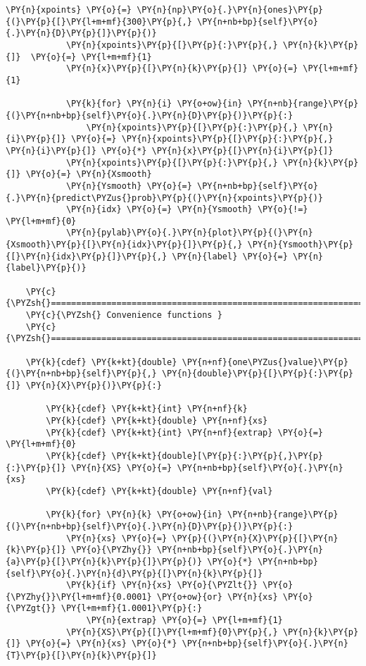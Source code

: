 \begin{Verbatim}[commandchars=\\\{\}]
            \PY{n}{xpoints} \PY{o}{=} \PY{n}{np}\PY{o}{.}\PY{n}{ones}\PY{p}{(}\PY{p}{[}\PY{l+m+mf}{300}\PY{p}{,} \PY{n+nb+bp}{self}\PY{o}{.}\PY{n}{D}\PY{p}{]}\PY{p}{)}
            \PY{n}{xpoints}\PY{p}{[}\PY{p}{:}\PY{p}{,} \PY{n}{k}\PY{p}{]}  \PY{o}{=} \PY{l+m+mf}{1}
            \PY{n}{x}\PY{p}{[}\PY{n}{k}\PY{p}{]} \PY{o}{=} \PY{l+m+mf}{1}

            \PY{k}{for} \PY{n}{i} \PY{o+ow}{in} \PY{n+nb}{range}\PY{p}{(}\PY{n+nb+bp}{self}\PY{o}{.}\PY{n}{D}\PY{p}{)}\PY{p}{:}
                \PY{n}{xpoints}\PY{p}{[}\PY{p}{:}\PY{p}{,} \PY{n}{i}\PY{p}{]} \PY{o}{=} \PY{n}{xpoints}\PY{p}{[}\PY{p}{:}\PY{p}{,} \PY{n}{i}\PY{p}{]} \PY{o}{*} \PY{n}{x}\PY{p}{[}\PY{n}{i}\PY{p}{]}
            \PY{n}{xpoints}\PY{p}{[}\PY{p}{:}\PY{p}{,} \PY{n}{k}\PY{p}{]} \PY{o}{=} \PY{n}{Xsmooth}
            \PY{n}{Ysmooth} \PY{o}{=} \PY{n+nb+bp}{self}\PY{o}{.}\PY{n}{predict\PYZus{}prob}\PY{p}{(}\PY{n}{xpoints}\PY{p}{)}
            \PY{n}{idx} \PY{o}{=} \PY{n}{Ysmooth} \PY{o}{!=} \PY{l+m+mf}{0}
            \PY{n}{pylab}\PY{o}{.}\PY{n}{plot}\PY{p}{(}\PY{n}{Xsmooth}\PY{p}{[}\PY{n}{idx}\PY{p}{]}\PY{p}{,} \PY{n}{Ysmooth}\PY{p}{[}\PY{n}{idx}\PY{p}{]}\PY{p}{,} \PY{n}{label} \PY{o}{=} \PY{n}{label}\PY{p}{)}
    
    \PY{c}{\PYZsh{}==========================================================================}
    \PY{c}{\PYZsh{} Convenience functions }
    \PY{c}{\PYZsh{}===========================================================================}

    \PY{k}{cdef} \PY{k+kt}{double} \PY{n+nf}{one\PYZus{}value}\PY{p}{(}\PY{n+nb+bp}{self}\PY{p}{,} \PY{n}{double}\PY{p}{[}\PY{p}{:}\PY{p}{]} \PY{n}{X}\PY{p}{)}\PY{p}{:}
        
        \PY{k}{cdef} \PY{k+kt}{int} \PY{n+nf}{k}
        \PY{k}{cdef} \PY{k+kt}{double} \PY{n+nf}{xs}
        \PY{k}{cdef} \PY{k+kt}{int} \PY{n+nf}{extrap} \PY{o}{=} \PY{l+m+mf}{0}
        \PY{k}{cdef} \PY{k+kt}{double}[\PY{p}{:}\PY{p}{,}\PY{p}{:}\PY{p}{]} \PY{n}{XS} \PY{o}{=} \PY{n+nb+bp}{self}\PY{o}{.}\PY{n}{xs}
        \PY{k}{cdef} \PY{k+kt}{double} \PY{n+nf}{val}

        \PY{k}{for} \PY{n}{k} \PY{o+ow}{in} \PY{n+nb}{range}\PY{p}{(}\PY{n+nb+bp}{self}\PY{o}{.}\PY{n}{D}\PY{p}{)}\PY{p}{:}
            \PY{n}{xs} \PY{o}{=} \PY{p}{(}\PY{n}{X}\PY{p}{[}\PY{n}{k}\PY{p}{]} \PY{o}{\PYZhy{}} \PY{n+nb+bp}{self}\PY{o}{.}\PY{n}{a}\PY{p}{[}\PY{n}{k}\PY{p}{]}\PY{p}{)} \PY{o}{*} \PY{n+nb+bp}{self}\PY{o}{.}\PY{n}{d}\PY{p}{[}\PY{n}{k}\PY{p}{]} 
            \PY{k}{if} \PY{n}{xs} \PY{o}{\PYZlt{}} \PY{o}{\PYZhy{}}\PY{l+m+mf}{0.0001} \PY{o+ow}{or} \PY{n}{xs} \PY{o}{\PYZgt{}} \PY{l+m+mf}{1.0001}\PY{p}{:}
                \PY{n}{extrap} \PY{o}{=} \PY{l+m+mf}{1}
            \PY{n}{XS}\PY{p}{[}\PY{l+m+mf}{0}\PY{p}{,} \PY{n}{k}\PY{p}{]} \PY{o}{=} \PY{n}{xs} \PY{o}{*} \PY{n+nb+bp}{self}\PY{o}{.}\PY{n}{T}\PY{p}{[}\PY{n}{k}\PY{p}{]}


\end{Verbatim}
